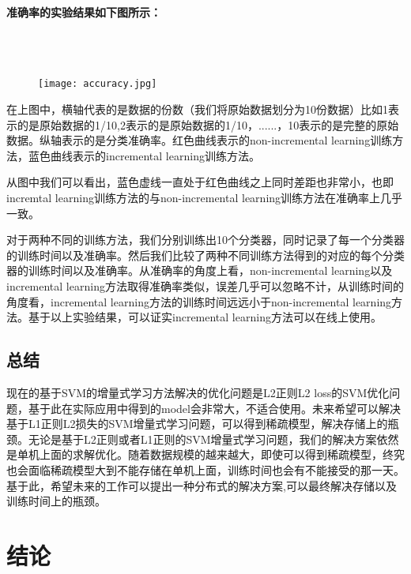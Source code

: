 \documentclass[master]{njuthesis}
\begin{document}
   \large{\textbf{准确率的实验结果如下图所示：}}\\
\\
\\
\\


    \begin{figure}[htbp]
      \centering
      \texttt{[image: accuracy.jpg]}\\
      \caption{}\label{fig:time}
    \end{figure}

    在上图中，横轴代表的是数据的份数（我们将原始数据划分为10份数据）比如1表示的是原始数据的1/10,2表示的是原始数据的1/10，......，10表示的是完整的原始数据。纵轴表示的是分类准确率。红色曲线表示的non-incremental learning训练方法，蓝色曲线表示的incremental learning训练方法。
    
    从图中我们可以看出，蓝色虚线一直处于红色曲线之上同时差距也非常小，也即incremtal learning训练方法的与non-incremental learning训练方法在准确率上几乎一致。
      
    对于两种不同的训练方法，我们分别训练出10个分类器，同时记录了每一个分类器的训练时间以及准确率。然后我们比较了两种不同训练方法得到的对应的每个分类器的训练时间以及准确率。从准确率的角度上看，non-incremental learning以及incremental learning方法取得准确率类似，误差几乎可以忽略不计，从训练时间的角度看，incremental learning方法的训练时间远远小于non-incremental learning方法。基于以上实验结果，可以证实incremental learning方法可以在线上使用。

\section{总结}

    现在的基于SVM的增量式学习方法解决的优化问题是L2正则L2 loss的SVM优化问题，基于此在实际应用中得到的model会非常大，不适合使用。未来希望可以解决基于L1正则L2损失的SVM增量式学习问题，可以得到稀疏模型，解决存储上的瓶颈。无论是基于L2正则或者L1正则的SVM增量式学习问题，我们的解决方案依然是单机上面的求解优化。随着数据规模的越来越大，即使可以得到稀疏模型，终究也会面临稀疏模型大到不能存储在单机上面，训练时间也会有不能接受的那一天。基于此，希望未来的工作可以提出一种分布式的解决方案,可以最终解决存储以及训练时间上的瓶颈。

\chapter{结论}\label{chapter_concludes}
\end{document}
